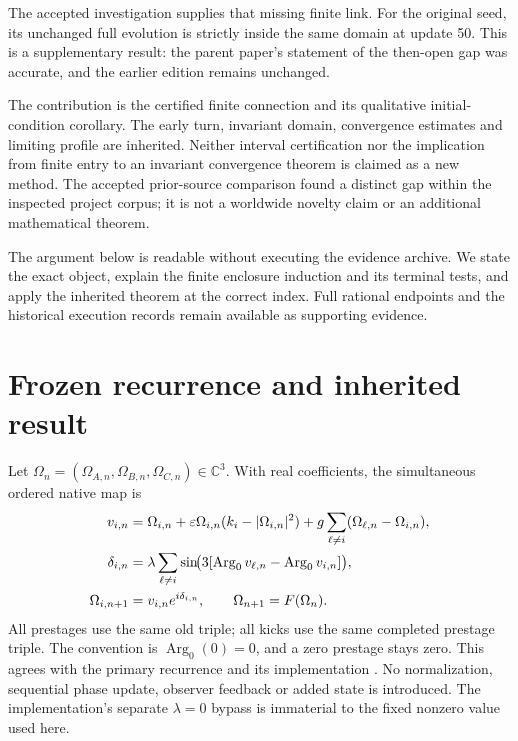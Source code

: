 \documentclass[11pt,a4paper]{article}
\numberwithin{equation}{section}
\theoremstyle{remark}\newtheorem{remark}[theorem]{Remark}
\newcommand{\C}{\mathbb C}\newcommand{\R}{\mathbb R}
\newcommand{\Argz}{\operatorname{Arg}_0}
\begin{document}
The accepted investigation \cite{capture,acceptance} supplies that missing finite link. For the original seed, its unchanged full evolution is strictly inside the same domain at update 50. This is a supplementary result: the parent paper's statement of the then-open gap was accurate, and the earlier edition remains unchanged.

The contribution is the certified finite connection and its qualitative initial-condition corollary. The early turn, invariant domain, convergence estimates and limiting profile are inherited. Neither interval certification nor the implication from finite entry to an invariant convergence theorem is claimed as a new method. The accepted prior-source comparison found a distinct gap within the inspected project corpus; it is not a worldwide novelty claim or an additional mathematical theorem.

The argument below is readable without executing the evidence archive. We state the exact object, explain the finite enclosure induction and its terminal tests, and apply the inherited theorem at the correct index. Full rational endpoints and the historical execution records remain available as supporting evidence.

\clearpage
\section{Frozen recurrence and inherited result}\label{sec:setting}
Let $\Omega_n=(\Omega_{A,n},\Omega_{B,n},\Omega_{C,n})\in\C^3$. With real coefficients, the simultaneous ordered native map is
\begin{align}
v_{i,n}&=\Omega_{i,n}+\eps\Omega_{i,n}(k_i-|\Omega_{i,n}|^2)
       +g\sum_{\ell\ne i}(\Omega_{\ell,n}-\Omega_{i,n}),\label{eq:pre}\\
\delta_{i,n}&=\lambda\sum_{\ell\ne i}
 \sin\!\bigl(3[\Argz v_{\ell,n}-\Argz v_{i,n}]\bigr),\label{eq:kick}\\
\Omega_{i,n+1}&=v_{i,n}e^{i\delta_{i,n}},\qquad\Omega_{n+1}=F(\Omega_n).
\label{eq:post}
\end{align}
All prestages use the same old triple; all kicks use the same completed prestage triple. The convention is $\Argz(0)=0$, and a zero prestage stays zero. This agrees with the primary recurrence and its implementation \cite{parent,kernel}. No normalization, sequential phase update, observer feedback or added state is introduced. The implementation's separate $\lambda=0$ bypass is immaterial to the fixed nonzero value used here.
\end{document}
